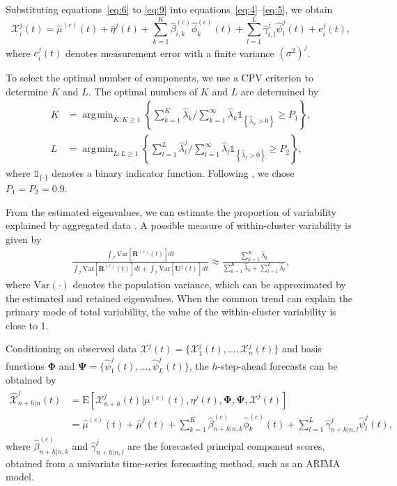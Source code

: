 \documentclass[12pt,a4paper]{article}
\newcommand{\X}{\mathcal{X}}
\DeclareMathOperator*{\argmin}{\arg\!\min}
\begin{document}
Substituting equations~\eqref{eq:6} to \eqref{eq:9} into equations~\eqref{eq:4}--\eqref{eq:5}, we obtain
\begin{equation*}
\X_i^j(t) = \widehat{\mu}^{(c)}(t) + \widehat{\eta}^j(t) + \sum^K_{k=1}\widehat{\beta}_{i,k}^{(c)}\widehat{\phi}_k^{(c)}(t) + \sum^L_{l=1}\widehat{\gamma}_{i,l}^j\widehat{\psi}^j_l(t) + e_i^j(t),
\end{equation*} 
where $e_i^j(t)$ denotes measurement error with a finite variance $(\sigma^2) ^j$.

To select the optimal number of components, we use a CPV criterion to determine $K$ and $L$. The optimal numbers of $K$ and $L$ are determined by
\begin{align*}
K &= \argmin_{K:K\geq 1}\left\{\sum^K_{k=1}\widehat{\lambda}_k\Big/\sum^{\infty}_{k=1}\widehat{\lambda}_k\mathds{1}_{\left\{\widehat{\lambda}_k>0\right\}}\geq P_1\right\}, \\
L &= \argmin_{L:L\geq 1} \left\{\sum^L_{l=1}\widehat{\lambda}_l^j\Big/\sum^{\infty}_{l=1}\widehat{\lambda}_l\mathds{1}_{\left\{\widehat{\lambda}_l>0\right\}}\geq P_2\right\},
\end{align*}
where $\mathds{1}_{\{\cdot\}}$ denotes a binary indicator function. Following \cite{Chiou12}, we chose $P_1 = P_2 = 0.9$.

From the estimated eigenvalues, we can estimate the proportion of variability explained by aggregated data \citep[also known as the variance explained by the within-cluster variability, see for example,][]{DCC+09}. A possible measure of within-cluster variability is given by
\begin{align}
\frac{\int_{\mathcal{I}}\text{Var}[\bm{R}^{(c)}(t)]dt}{\int_{\mathcal{I}}\text{Var}[\bm{R}^{(c)}(t)]dt + \int_{\mathcal{I}}\text{Var}[\bm{U}^j(t)]dt}\approx \frac{\sum^{K}_{k=1}\widehat{\lambda}_k}{\sum^{K}_{k=1}\widehat{\lambda}_k+\sum^L_{l=1}\widehat{\lambda}_l}, \label{eq:10}
\end{align}
where $\text{Var}(\cdot)$ denotes the population variance, which can be approximated by the estimated and retained eigenvalues. When the common trend can explain the primary mode of total variability, the value of the within-cluster variability is close to 1.

Conditioning on observed data $\bm{\X}^j(t) = \{\X_1^j(t),\dots,\X_n^j(t)\}$ and basis functions $\bm{\Phi}$ and $\bm{\Psi}=\big\{\widehat{\psi}_1^j(t),\dots,\widehat{\psi}_L^j(t)\big\}$, the $h$-step-ahead forecasts can be obtained by
\begin{align*}
\widehat{\mathcal{X}}_{n+h|n}^{j}(t) &= \text{E}\left[\X_{n+h}^j(t)\Big|\mu^{(c)}(t),\eta^j(t),\bm{\Phi},\bm{\Psi},\bm{\X}^j(t)\right]\\
 &= \widehat{\mu}^{(c)}(t) + \widehat{\mu}^{j}(t) + \sum^K_{k=1}\widehat{\beta}_{n+h|n,k}^{(c)}\widehat{\phi}_k^{(c)}(t)  + \sum^L_{l=1}\widehat{\gamma}_{n+h|n,l}^{j}\widehat{\psi}_l^{j}(t), 
\end{align*}
where $\widehat{\beta}^{(c)}_{n+h|n,k}$ and $\widehat{\gamma}_{n+h|n,l}^j$ are the forecasted principal component scores, obtained from a univariate time-series forecasting method, such as an ARIMA model.
\end{document}
